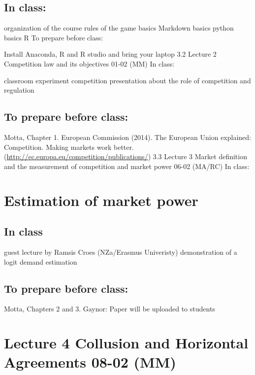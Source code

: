 \documentclass[]{book}
\begin{document}
\subsection{In class:}\label{in-class}

organization of the course rules of the game basics Markdown basics
python basics R To prepare before class:

Install Anaconda, R and R studio and bring your laptop 3.2 Lecture 2
Competition law and its objectives 01-02 (MM) In class:

classroom experiment competition presentation about the role of
competition and regulation

\subsection{To prepare before class:}\label{to-prepare-before-class}

Motta, Chapter 1. European Commission (2014). The European Union
explained: Competition. Making markets work better.
(\url{http://ec.europa.eu/competition/publications/}) 3.3 Lecture 3
Market definition and the measurement of competition and market power
06-02 (MA/RC) In class:

\section{Estimation of market power}\label{estimation-of-market-power}

\subsection{In class}\label{in-class-1}

guest lecture by Ramsis Croes (NZa/Erasmus Univeristy) demonstration of
a logit demand estimation

\subsection{To prepare before class:}\label{to-prepare-before-class-1}

Motta, Chapters 2 and 3. Gaynor: Paper will be uploaded to students

\section{Lecture 4 Collusion and Horizontal Agreements 08-02
(MM)}\label{lecture-4-collusion-and-horizontal-agreements-08-02-mm}
\end{document}
